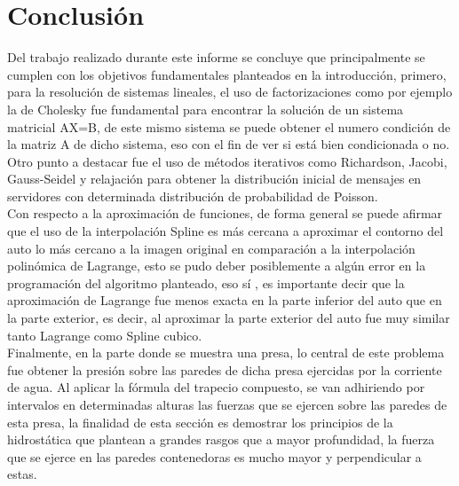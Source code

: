 \documentclass{udpreport}
\begin{document}
\chapter{Conclusión}
Del trabajo realizado durante este informe se concluye que principalmente se cumplen con los objetivos fundamentales planteados en la introducción,  primero, para la resolución de sistemas lineales, el uso de factorizaciones como por ejemplo la de Cholesky fue fundamental para encontrar la solución de un sistema matricial AX=B, de este mismo sistema se puede obtener el numero condición de la matriz A de dicho sistema, eso con el fin de ver si está bien condicionada o no.
\\
Otro punto a destacar fue el uso de métodos iterativos como Richardson, Jacobi, Gauss-Seidel y relajación para obtener la distribución inicial de mensajes en servidores con determinada distribución de probabilidad de Poisson.
\\
Con respecto a la aproximación de funciones, de forma general se puede afirmar que el uso de la interpolación Spline es más cercana a aproximar el contorno del auto lo más cercano a la imagen original en comparación a la interpolación polinómica de Lagrange, esto se pudo deber posiblemente a algún error en la programación del algoritmo planteado, eso sí , es importante decir que la aproximación de Lagrange fue menos exacta en la parte inferior del auto que en la parte exterior, es decir, al aproximar la parte exterior del auto fue muy similar tanto Lagrange como Spline cubico. 
\\
Finalmente, en la parte donde se muestra una presa, lo central de este problema fue obtener la presión sobre las paredes de dicha presa ejercidas por la corriente de agua. Al aplicar la fórmula del trapecio compuesto, se van adhiriendo por intervalos en determinadas alturas las fuerzas que se ejercen sobre las paredes de esta presa, la finalidad de esta sección es demostrar los principios de la hidrostática que plantean a grandes rasgos que a mayor profundidad, la fuerza que se ejerce en las paredes contenedoras es mucho mayor y perpendicular a estas.
\end{document}
